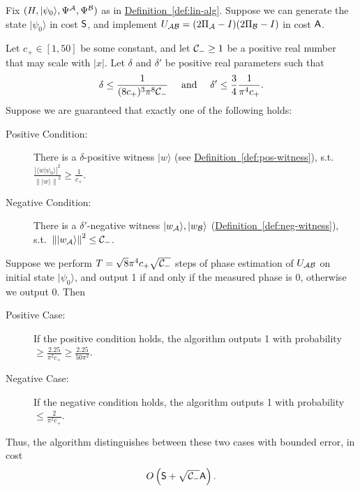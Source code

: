 \documentclass{theoretics}
\newcommand{\defin}[1]{\hyperref[def:#1]{Definition~\ref*{def:#1}}}
\def\ket#1{{\lvert}#1\rangle}
\renewcommand{\>}{\rangle}
\newcommand{\<}{\langle}
\renewcommand{\(}{\left(}
\renewcommand{\)}{\right)}
\def\braket#1#2{{{\langle}#1\vert}#2\rangle}
\def\norm#1{\left\| #1 \right\|}
\begin{document}
\begin{theorem}\label{thm:lin-alg-fwk}
Fix $(H,\ket{\psi_0},\Psi^{\cal A},\Psi^{\cal B})$ as in \defin{lin-alg}.
Suppose we can generate the state $\ket{\psi_0}$ in cost ${\sf S}$, and implement $U_{\cal AB}=(2\Pi_{\cal A}-I)(2\Pi_{\cal B}-I)$ in cost ${\sf A}$.

\noindent Let $c_+\in [1,50]$ be some constant, and let ${\cal C}_-\geq 1$ be a positive real number that may scale with $|x|$. Let $\delta$ and $\delta'$ be positive real parameters such that 
\begin{equation*}
\delta\leq \frac{1}{(8c_+)^{3}\pi^8{{\cal C}_-}}\quad\mbox{ and }\quad\delta'\leq \frac{3}{4}\frac{1}{\pi^4c_+}.
\end{equation*}
Suppose we are guaranteed that exactly one of the following holds:
\begin{description}
\item[Positive Condition:] There is a $\delta$-positive witness $\ket{w}$ (see \defin{pos-witness}), s.t.~$\frac{|\braket{w}{\psi_0}|^2}{\norm{\ket{w}}^2}\geq \frac{1}{c_+}$. 
\item[Negative Condition:] There is a $\delta'$-negative witness $\ket{w_{\cal A}},\ket{w_{\cal B}}$ (\defin{neg-witness}), s.t.~$\norm{\ket{w_{\cal A}}}^2 \leq {\cal C}_-$.
\end{description}
Suppose we perform $T= \sqrt{8}\pi^4 c_+\sqrt{{\cal C}_-}$ steps of phase estimation of $U_{\cal AB}$ on initial state $\ket{\psi_0}$, and output 1 if and only if the measured phase is 0, otherwise we output 0. Then
\begin{description}
\item[Positive Case:] If the positive condition holds, the algorithm outputs 1 with probability 
$
\geq\frac{2.25}{\pi^2c_+}\geq \frac{2.25}{50\pi^2}.
$ 
\item[Negative Case:] If the negative condition holds, the algorithm outputs 1 with probability 
$
\leq\frac{2}{\pi^2c_+}.
$ 
\end{description}
Thus, the algorithm distinguishes between these two cases with bounded error, in cost
$$O\left({\sf S}+\sqrt{{\cal C}_-}{\sf A}\right).$$
\end{theorem}
\end{document}
